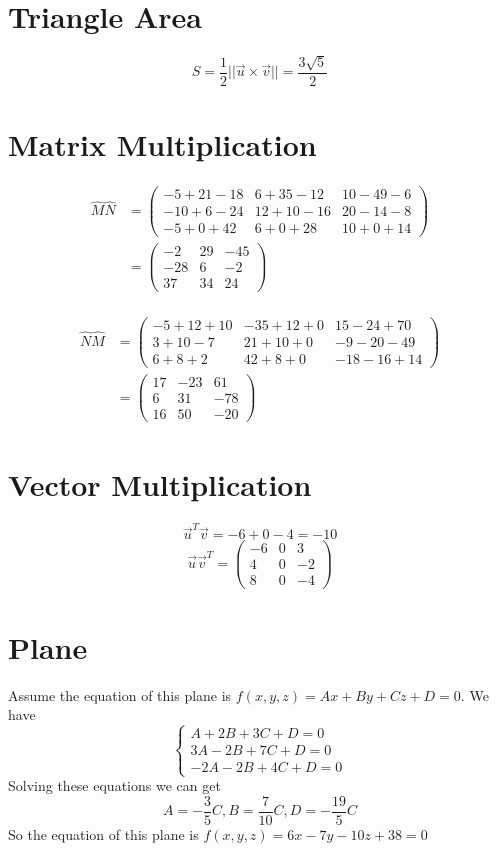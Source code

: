 \documentclass[10pt,twocolumn,twoside,a4paper]{article}
\begin{document}
\section*{Triangle Area}
\[
S=\frac{1}{2}||\vec{u}\times\vec{v}||=\frac{3\sqrt{5}}{2} 
\]
\section*{Matrix Multiplication}
\begin{align*}
\hat M\hat N
&=\left(
\begin{array}{ccc}
-5+21-18&6+35-12&10-49-6\\
-10+6-24&12+10-16&20-14-8\\
-5+0+42&6+0+28&10+0+14
\end{array}
\right)\\
&=\left(
\begin{array}{ccc}
-2&29&-45\\
-28&6&-2\\
37&34&24
\end{array}
\right)
\end{align*}
\\
\begin{align*}
\hat N\hat M
&=\left(
\begin{array}{ccc}
-5+12+10&-35+12+0&15-24+70\\
3+10-7&21+10+0&-9-20-49\\
6+8+2&42+8+0&-18-16+14
\end{array}
\right)\\
&=\left(
\begin{array}{ccc}
17&-23&61\\
6&31&-78\\
16&50&-20
\end{array}
\right)
\end{align*}
\section*{Vector Multiplication}
\[
\vec{u}^T\vec{v}=-6+0-4=-10
\]
\[
\vec{u}\vec{v}^T=\left(
\begin{array}{ccc}
-6&0&3\\
4&0&-2\\
8&0&-4
\end{array}
\right)
\]
\section*{Plane}
Assume the equation of this plane is $f(x,y,z)=Ax+By+Cz+D=0$. We have
\[
\left\{
\begin{array}{ccc}
A+2B+3C+D=0\\
3A-2B+7C+D=0\\
-2A-2B+4C+D=0
\end{array}
\right.
\]
Solving these equations we can get 
\[
A=-\frac{3}{5}C, B=\frac{7}{10}C,D=-\frac{19}{5}C
\]
So the equation of this plane is $f(x,y,z)=6x-7y-10z+38=0$
\end{document}
